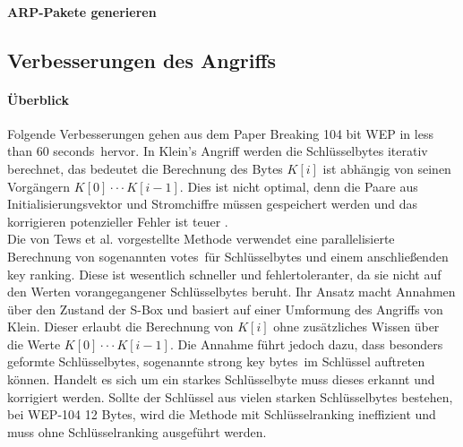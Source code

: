 \documentclass[10pt,a4paper]{article}
\begin{document}
\paragraph{ARP-Pakete generieren}

\subsection{Verbesserungen des Angriffs}
\paragraph{Überblick}
Folgende Verbesserungen gehen aus dem Paper \glqq Breaking 104 bit WEP in less than 60 seconds\grqq \cite{TWP07}\ hervor.
In Klein's Angriff werden die Schlüsselbytes iterativ berechnet, das bedeutet die Berechnung des Bytes $K[i]$ ist abhängig von seinen Vorgängern $K[0]\cdot\cdot\cdot K[i-1]$. Dies ist nicht optimal, denn die Paare aus Initialisierungsvektor und Stromchiffre müssen gespeichert werden und das korrigieren potenzieller Fehler ist teuer \cite[chapter 4]{TWP07}.\\ Die von Tews et al. vorgestellte Methode verwendet eine parallelisierte Berechnung von sogenannten \glqq votes\grqq\ für Schlüsselbytes und einem anschließenden \glqq key ranking\grqq. Diese ist wesentlich schneller und fehlertoleranter, da sie nicht auf den Werten vorangegangener Schlüsselbytes beruht. Ihr Ansatz macht Annahmen über den Zustand der S-Box und basiert auf einer Umformung des Angriffs von Klein. Dieser erlaubt die Berechnung von $K[i]$ ohne zusätzliches Wissen über die Werte $K[0]\cdot\cdot\cdot K[i-1]$. Die Annahme führt jedoch dazu, dass besonders geformte Schlüsselbytes, sogenannte \glqq strong key bytes\grqq\ im Schlüssel auftreten können. Handelt es sich um ein starkes Schlüsselbyte muss dieses erkannt und korrigiert werden. Sollte der Schlüssel aus vielen starken Schlüsselbytes bestehen, bei WEP-104 12 Bytes, wird die Methode mit Schlüsselranking ineffizient und muss ohne Schlüsselranking ausgeführt werden.
\end{document}
